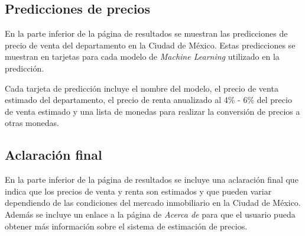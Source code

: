 \subsection{Predicciones de precios}
En la parte inferior de la página de resultados se muestran las predicciones de
precio de venta del departamento en la Ciudad de México. Estas predicciones se
muestran en tarjetas para cada modelo de \textit{Machine Learning} utilizado en
la predicción.

Cada tarjeta de predicción incluye el nombre del modelo, el precio de venta estimado
del departamento, el precio de renta anualizado al 4\% - 6\% del precio de venta
estimado y una lista de monedas para realizar la conversión de precios a otras
monedas.

\subsection{Aclaración final}
En la parte inferior de la página de resultados se incluye una aclaración final
que indica que los precios de venta y renta son estimados y que pueden variar
dependiendo de las condiciones del mercado inmobiliario en la Ciudad de México.
Además se incluye un enlace a la página de \textit{Acerca de} para que el usuario
pueda obtener más información sobre el sistema de estimación de precios.

